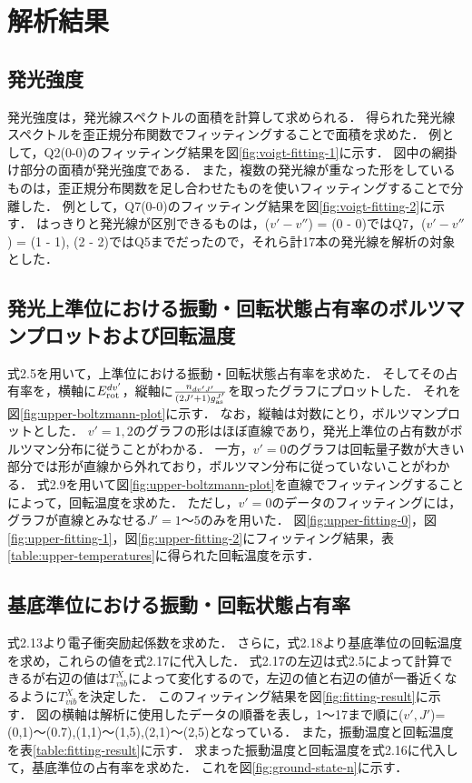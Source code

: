 \chapter{解析結果}

\section{発光強度}
発光強度は，発光線スペクトルの面積を計算して求められる．
得られた発光線スペクトルを歪正規分布関数でフィッティングすることで面積を求めた．
例として，Q2(0-0)のフィッティング結果を図\ref{fig:voigt-fitting-1}に示す．
図中の網掛け部分の面積が発光強度である．
また，複数の発光線が重なった形をしているものは，歪正規分布関数を足し合わせたものを使いフィッティングすることで分離した．
例として，Q7(0-0)のフィッティング結果を図\ref{fig:voigt-fitting-2}に示す．
はっきりと発光線が区別できるものは，($v'-v''$) = (0 - 0)ではQ7，($v'-v''$) = (1 - 1), (2 - 2)ではQ5までだったので，それら計17本の発光線を解析の対象とした．

\section{発光上準位における振動・回転状態占有率のボルツマンプロットおよび回転温度}
式2.5を用いて，上準位における振動・回転状態占有率を求めた．
そしてその占有率を，横軸に$E^{dv'}_{\rm rot}$，縦軸に$\frac{n_{dv'J'}}{\left( 2J'+1 \right) g^{J'}_{\rm as}}$を取ったグラフにプロットした．
それを図\ref{fig:upper-boltzmann-plot}に示す．
なお，縦軸は対数にとり，ボルツマンプロットとした．
$v'=1,2$のグラフの形はほぼ直線であり，発光上準位の占有数がボルツマン分布に従うことがわかる．
一方，$v'=0$のグラフは回転量子数が大きい部分では形が直線から外れており，ボルツマン分布に従っていないことがわかる．
式2.9を用いて図\ref{fig:upper-boltzmann-plot}を直線でフィッティングすることによって，回転温度を求めた．
ただし，$v'=0$のデータのフィッティングには，グラフが直線とみなせる$J'=1〜5$のみを用いた．
図\ref{fig:upper-fitting-0}，図\ref{fig:upper-fitting-1}，図\ref{fig:upper-fitting-2}にフィッティング結果，表\ref{table:upper-temperatures}に得られた回転温度を示す．

\section{基底準位における振動・回転状態占有率}
式2.13より電子衝突励起係数を求めた．
さらに，式2.18より基底準位の回転温度を求め，これらの値を式2.17に代入した．
式2.17の左辺は式2.5によって計算できるが右辺の値は$T^X_{vib}$によって変化するので，左辺の値と右辺の値が一番近くなるように$T^X_{vib}$を決定した．
このフィッティング結果を図\ref{fig:fitting-result}に示す．
図の横軸は解析に使用したデータの順番を表し，1〜17まで順に($v',J'$)=(0,1)〜(0.7),(1,1)〜(1,5),(2,1)〜(2,5)となっている．
また，振動温度と回転温度を表\ref{table:fitting-result}に示す．
求まった振動温度と回転温度を式2.16に代入して，基底準位の占有率を求めた．
これを図\ref{fig:ground-state-n}に示す．